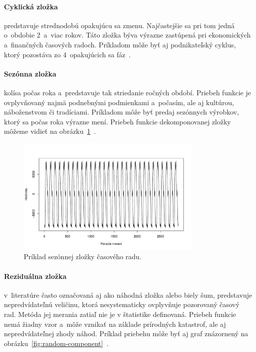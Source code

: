 \documentclass[a4paper,twoside,slovak,12pt,appendix]{article}
\begin{document}
\paragraph{Cyklická zložka} predstavuje strednodobú opakujúcu sa zmenu.
Najčastejšie sa pri tom jedná o~obdobie 2~a~viac rokov. Táto zložka býva výrazne
zastúpená pri ekonomických a~finančných časových radoch. Príkladom môže byť
aj podnikateľský cyklus, ktorý pozostáva zo 4~opakujúcich sa
fáz~\cite{Agrawal2013}.

\paragraph{Sezónna zložka} kolísa počas roka a~predstavuje tak striedanie
ročných období. Priebeh funkcie je ovplyvňovaný najmä podnebnými podmienkami
a~počasím, ale aj kultúrou, náboženstvom či tradíciami. Príkladom môže byť
predaj sezónnych výrobkov, ktorý sa počas roka výrazne mení. Priebeh funkcie
dekomponovanej zložky môžeme vidieť na
obrázku~\ref{fig:seasonal-component}~\cite{Agrawal2013}.

\begin{figure}[]
  \centering
  \includegraphics[width=0.8\textwidth]{season_component.pdf}
  \caption{Príklad sezónnej zložky časového radu.}
  \label{fig:seasonal-component}
\end{figure}

\paragraph{Reziduálna zložka} v~literatúre často označovaná aj ako náhodná
zložka alebo biely šum, predstavuje nepredvídateľnú veličinu, ktorá
nesystematicky ovplyvňuje pozorovaný časový rad. Metóda jej merania zatiaľ nie
je v štatistike definovaná. Priebeh funkcie nemá žiadny vzor a~môže vznikať na
základe prírodných katastrof, ale aj nepredvídateľnej zhody náhod. Príklad
priebehu môže byť aj graf znázornený na
obrázku~\ref{fig:random-component}~\cite{Agrawal2013}.
\end{document}
